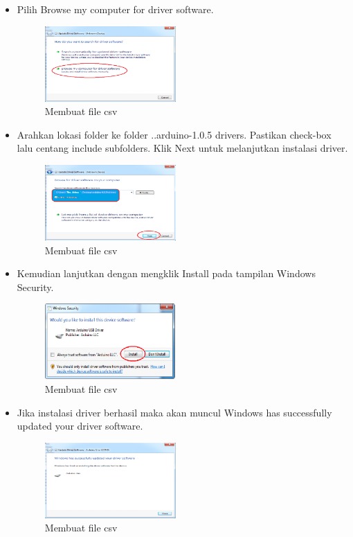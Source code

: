 \begin{enumerate}
\begin{itemize}
        \item Pilih Browse my computer for driver software.
        \begin{figure}[H]	
            \includegraphics[width=5cm]{figures/5/1174003/teori/6.png}
            \centering
            \caption{Membuat file csv}
        \end{figure}

        \item Arahkan lokasi folder ke folder ..arduino-1.0.5 drivers. Pastikan check-box lalu centang include subfolders. Klik Next untuk melanjutkan instalasi driver.
        \begin{figure}[H]	
            \includegraphics[width=5cm]{figures/5/1174003/teori/7.png}
            \centering
            \caption{Membuat file csv}
        \end{figure}

        \item Kemudian lanjutkan dengan mengklik Install pada tampilan Windows Security.
        \begin{figure}[H]	
            \includegraphics[width=5cm]{figures/5/1174003/teori/8.png}
            \centering
            \caption{Membuat file csv}
        \end{figure}

        \item Jika instalasi driver berhasil maka akan muncul Windows has successfully updated your driver software.
        \begin{figure}[H]	
            \includegraphics[width=5cm]{figures/5/1174003/teori/9.png}
            \centering
            \caption{Membuat file csv}
        \end{figure}


\end{itemize}
\end{enumerate}
